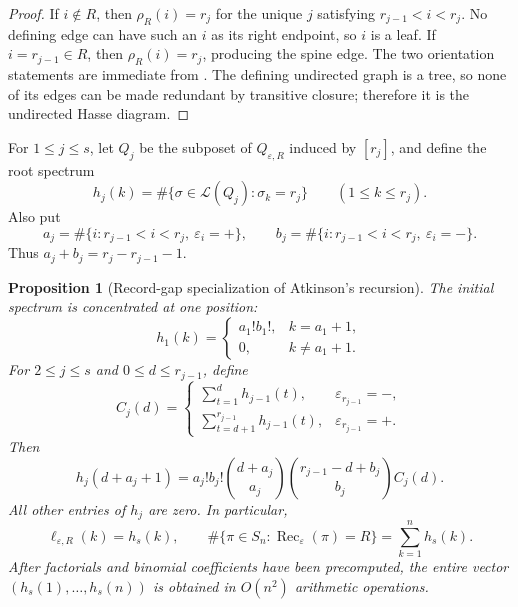 \documentclass[11pt,letterpaper,reqno]{amsart}
\newtheorem{proposition}[theorem]{Proposition}
\theoremstyle{definition}
\newcommand{\eps}{\varepsilon}
\begin{document}
\begin{proof}
If \(i\notin R\), then \(\rho_R(i)=r_j\) for the unique \(j\) satisfying
\(r_{j-1}<i<r_j\).  No defining edge can have such an \(i\) as its right
endpoint, so \(i\) is a leaf.  If \(i=r_{j-1}\in R\), then
\(\rho_R(i)=r_j\), producing the spine edge.  The two orientation statements
are immediate from .  The defining undirected graph is a
tree, so none of its edges can be made redundant by transitive closure;
therefore it is the undirected Hasse diagram.
\end{proof}

For \(1\le j\le s\), let \(Q_j\) be the subposet of \(Q_{\eps,R}\) induced by
\([r_j]\), and define the root spectrum
\[
h_j(k)=\#\{\sigma\in\mathcal L(Q_j):\sigma_k=r_j\}
\qquad(1\le k\le r_j).
\]
Also put
\[
a_j=\#\{i:r_{j-1}<i<r_j,\ \eps_i=+\},\qquad
b_j=\#\{i:r_{j-1}<i<r_j,\ \eps_i=-\}.
\]
Thus \(a_j+b_j=r_j-r_{j-1}-1\).

\begin{proposition}[Record-gap specialization of Atkinson's recursion]
\label{thm:record-tree-spectrum}
The initial spectrum is concentrated at one position:
\[
h_1(k)=
\begin{cases}
a_1!b_1!,&k=a_1+1,\\
0,&k\ne a_1+1.
\end{cases}
\]
For \(2\le j\le s\) and \(0\le d\le r_{j-1}\), define
\[
C_j(d)=
\begin{cases}
\displaystyle\sum_{t=1}^{d}h_{j-1}(t),
 &\eps_{r_{j-1}}=-,\\[3mm]
\displaystyle\sum_{t=d+1}^{r_{j-1}}h_{j-1}(t),
 &\eps_{r_{j-1}}=+.
\end{cases}
\]
Then
\begin{equation}
\label{eq:record-tree-spectrum-recursion}
h_j(d+a_j+1)
 =a_j!b_j!
  \binom{d+a_j}{a_j}
  \binom{r_{j-1}-d+b_j}{b_j}
  C_j(d).
\end{equation}
All other entries of \(h_j\) are zero.  In particular,
\[
\ell_{\eps,R}(k)=h_s(k),
\qquad
\#\{\pi\in S_n:\operatorname{Rec}_\eps(\pi)=R\}
 =\sum_{k=1}^{n}h_s(k).
\]
After factorials and binomial coefficients have been precomputed, the entire
vector \((h_s(1),\ldots,h_s(n))\) is obtained in \(O(n^2)\) arithmetic
operations.
\end{proposition}
\end{document}
